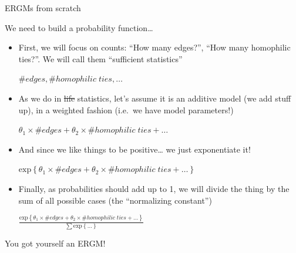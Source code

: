 \documentclass[10pt,ignorenonframetext,aspectratio=169,]{beamer}
\renewcommand{\exp}[1]{\mbox{exp}\left\{#1\right\}}
\begin{document}
\begin{frame}{ERGMs from scratch}
\protect\hypertarget{ergms-from-scratch}{}

We need to build a probability function\ldots{}\pause

\begin{itemize}
\item
  First, we will focus on counts: ``How many edges?'', ``How many
  homophilic ties?''. We will call them ``sufficient statistics''

  \(\# edges, \#homophilic\;ties, \dots\) \pause
\item
  As we do in \sout{life} statistics, let's assume it is an additive
  model (we add stuff up), in a weighted fashion (i.e.~we have model
  parameters!)

  \(\theta_{1} \times \#edges + \theta_{2} \times \#homophilic\;ties + \dots\)
  \pause
\item
  And since we like things to be positive\ldots{} we just exponentiate
  it!

  \(\exp{\theta_{1} \times \#edges + \theta_{2} \times \#homophilic\;ties + \dots}\)
  \pause
\item
  Finally, as probabilities should add up to 1, we will divide the thing
  by the sum of all possible cases (the ``normalizing constant'')

  \(\frac{\exp{\theta_{1} \times \#edges + \theta_{2} \times \#homophilic\;ties + \dots}}{\sum \exp{\dots}}\)\pause
\end{itemize}

You got yourself an ERGM!

\end{frame}
\end{document}
